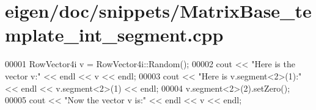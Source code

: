\hypertarget{eigen_2doc_2snippets_2_matrix_base__template__int__segment_8cpp_source}{}\section{eigen/doc/snippets/\+Matrix\+Base\+\_\+template\+\_\+int\+\_\+segment.cpp}
\label{eigen_2doc_2snippets_2_matrix_base__template__int__segment_8cpp_source}

\begin{DoxyCode}
00001 RowVector4i v = RowVector4i::Random();
00002 cout << \textcolor{stringliteral}{"Here is the vector v:"} << endl << v << endl;
00003 cout << \textcolor{stringliteral}{"Here is v.segment<2>(1):"} << endl << v.segment<2>(1) << endl;
00004 v.segment<2>(2).setZero();
00005 cout << \textcolor{stringliteral}{"Now the vector v is:"} << endl << v << endl;
\end{DoxyCode}
